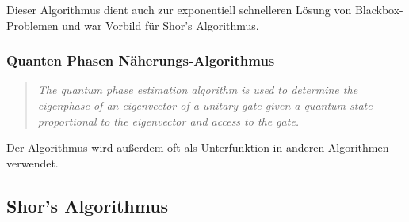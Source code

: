 Dieser Algorithmus dient auch zur exponentiell schnelleren Lösung von Blackbox-Problemen und war Vorbild für Shor's Algorithmus. \cite{quantenalgorithmgwiki}

\subsubsection{Quanten Phasen Näherungs-Algorithmus}

\begin{quote}
    \textit{The quantum phase estimation algorithm is used to determine the eigenphase of an eigenvector of a unitary gate given a quantum state proportional to the eigenvector and access to the gate.}\cite{quantenalgorithmgwiki}
\end{quote}
Der Algorithmus wird außerdem oft als Unterfunktion in anderen Algorithmen verwendet. 

\subsection{Shor's Algorithmus}
\label{sec:Shor's Algorithmus}



